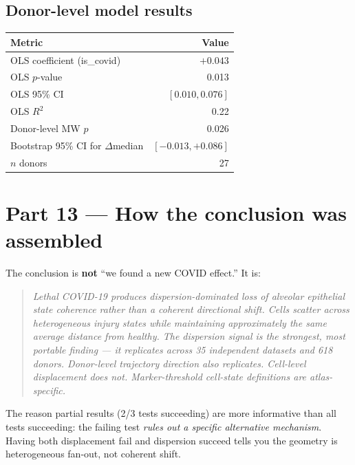 \documentclass[11pt]{article}
\begin{document}
\subsection{Donor-level model results}

\begin{center}
\small
\begin{tabular}{lr}
\toprule
Metric & Value \\
\midrule
OLS coefficient (is\_covid) & $+0.043$ \\
OLS $p$-value & 0.013 \\
OLS 95\% CI & $[0.010, 0.076]$ \\
OLS $R^2$ & 0.22 \\
Donor-level MW $p$ & 0.026 \\
Bootstrap 95\% CI for $\Delta$median & $[-0.013, +0.086]$ \\
$n$ donors & 27 \\
\bottomrule
\end{tabular}
\end{center}


\section{Part 13 --- How the conclusion was assembled}

The conclusion is \textbf{not} ``we found a new COVID effect.'' It is:

\begin{quote}
\emph{Lethal COVID-19 produces dispersion-dominated loss of alveolar epithelial state coherence rather than a coherent directional shift. Cells scatter across heterogeneous injury states while maintaining approximately the same average distance from healthy. The dispersion signal is the strongest, most portable finding --- it replicates across 35 independent datasets and 618 donors. Donor-level trajectory direction also replicates. Cell-level displacement does not. Marker-threshold cell-state definitions are atlas-specific.}
\end{quote}

The reason partial results (2/3 tests succeeding) are more informative than all tests succeeding: the failing test \emph{rules out a specific alternative mechanism}. Having both displacement fail and dispersion succeed tells you the geometry is heterogeneous fan-out, not coherent shift.
\end{document}
